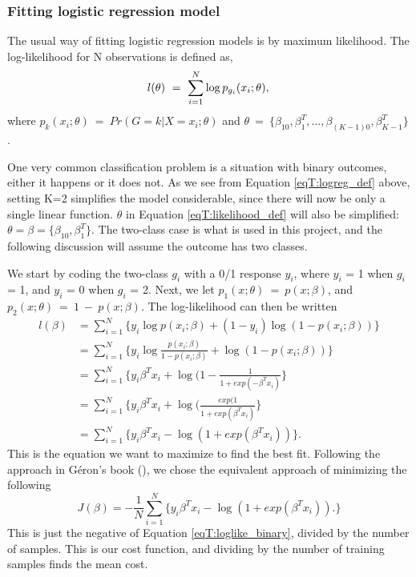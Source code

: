 \subsubsection{Fitting logistic regression model}
The usual way of fitting logistic regression models is by maximum likelihood. The log-likelihood for N observations is defined as,
\begin{equation}\label{eqT:likelihood_def}
l(\theta)\ =\ \sum_{i=1}^{N}\log p_{g_i}(x_i;\theta),\\
\end{equation}
where $p_k(x_i;\theta)\ =\ Pr(G=k|X=x_i;\theta)$ and $\theta\ =\ \{\beta_{10}, \beta_1^T,\dots, \beta_{(K-1)0}, \beta_{K-1}^T\}$.

One very common classification problem is a situation with binary outcomes, either it happens or it does not. As we see from Equation \ref{eqT:logreg_def} above, setting K=2 simplifies the model considerable, since there will now be only a single linear function. $\theta$ in Equation \ref{eqT:likelihood_def} will also be simplified: $\theta = \beta = \{\beta_{10}, \beta_1^T\}$. The two-class case is what is used in this project, and the following discussion will assume the outcome has two classes.

We start by coding the two-class $g_i$ with a 0/1 response $y_i$, where $y_i$ = 1 when $g_i$ = 1, and $y_i$ = 0 when $g_i$ = 2. Next, we let $p_1(x;\theta)\ =\ p(x;\beta)$, and $p_2(x;\theta)\ =\ 1\ -\ p(x;\beta)$. The log-likelihood can then be written
\begin{equation}\label{eqT:loglike_binary}
\begin{split}
l(\beta) &= \sum_{i=1}^N\{y_i\log p(x_i;\beta)+(1-y_i)\log(1-p(x_i;\beta))\}\\
 &= \sum_{i=1}^N\{y_i\log\frac{p(x_i;\beta)}{1-p(x_i;\beta)}+\log(1-p(x_i;\beta))\}\\
 &= \sum_{i=1}^N\{y_i\beta^Tx_i + \log(1-\frac{1}{1+exp(-\beta^Tx_i)}\}\\
 &= \sum_{i=1}^N\{y_i\beta^Tx_i + \log(\frac{exp(1}{1+exp(\beta^Tx_i)}\}\\
 &= \sum_{i=1}^N\{y_i\beta^Tx_i - \log(1+exp(\beta^Tx_i))\}.
\end{split}
\end{equation}
This is the equation we want to maximize to find the best fit. Following the approach in Géron's book (), we chose the equivalent approach of minimizing the following\\
\begin{equation}\label{Geron_cost}
J(\beta) = -\frac{1}{N}\sum_{i=1}^N\{y_i\beta^Tx_i - \log(1+exp(\beta^Tx_i)).\}
\end{equation}
This is just the negative of Equation \ref{eqT:loglike_binary}, divided by the number of samples. This is our cost function, and dividing by the number of training samples finds the mean cost.

